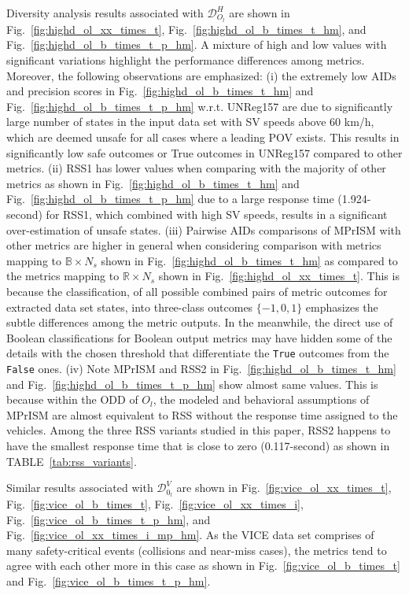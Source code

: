 \documentclass[journal]{IEEEtran}
\begin{document}
Diversity analysis results associated with $\mathcal{D}_{O_l}^H$ are shown in Fig.~\ref{fig:highd_ol_xx_times_t}, Fig.~\ref{fig:highd_ol_b_times_t_hm}, and Fig.~\ref{fig:highd_ol_b_times_t_p_hm}. A mixture of high and low values with significant variations highlight the performance differences among metrics. Moreover, the following observations are emphasized: (i) the extremely low AIDs and precision scores in Fig.~\ref{fig:highd_ol_b_times_t_hm} and Fig.~\ref{fig:highd_ol_b_times_t_p_hm} w.r.t. UNReg157 are due to significantly large number of states in the input data set with SV speeds above 60 km/h, which are deemed unsafe for all cases where a leading POV exists. This results in significantly low safe outcomes or True outcomes in UNReg157 compared to other metrics. (ii) RSS1 has lower values when comparing with the majority of other metrics as shown in Fig.~\ref{fig:highd_ol_b_times_t_hm} and Fig.~\ref{fig:highd_ol_b_times_t_p_hm} due to a large response time (1.924-second) for RSS1, which combined with high SV speeds, results in a significant over-estimation of unsafe states. (iii) Pairwise AIDs comparisons of MPrISM with other metrics are higher in general when considering comparison with metrics mapping to $\mathbb{B}\times N_s$ shown in Fig.~\ref{fig:highd_ol_b_times_t_hm} as compared to the metrics mapping to $\mathbb{R}\times N_s$ shown in Fig.~\ref{fig:highd_ol_xx_times_t}. This is because the classification, of all possible combined pairs of metric outcomes for extracted data set states, into three-class outcomes $\{-1,0,1\}$ emphasizes the subtle differences among the metric outputs. In the meanwhile, the direct use of Boolean classifications for Boolean output metrics may have hidden some of the details with the chosen threshold that differentiate the \texttt{True} outcomes from the \texttt{False} ones. (iv) Note MPrISM and RSS2 in Fig.~\ref{fig:highd_ol_b_times_t_hm} and Fig.~\ref{fig:highd_ol_b_times_t_p_hm} show almost same values. This is because within the ODD of $O_l$, the modeled and behavioral assumptions of MPrISM are almost equivalent to RSS without the response time assigned to the vehicles. Among the three RSS variants studied in this paper, RSS2 happens to have the smallest response time that is close to zero (0.117-second) as shown in TABLE~\ref{tab:rss_variants}.

Similar results associated with $\mathcal{D}^V_{0_l}$ are shown in Fig.~\ref{fig:vice_ol_xx_times_t}, Fig.~\ref{fig:vice_ol_b_times_t}, Fig.~\ref{fig:vice_ol_xx_times_i}, Fig.~\ref{fig:vice_ol_b_times_t_p_hm}, and Fig.~\ref{fig:vice_ol_xx_times_i_mp_hm}. As the VICE data set comprises of many safety-critical events (collisions and near-miss cases), the metrics tend to agree with each other more in this case as shown in Fig.~\ref{fig:vice_ol_b_times_t} and Fig.~\ref{fig:vice_ol_b_times_t_p_hm}.
\end{document}
